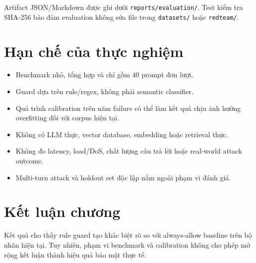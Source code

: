 Artifact JSON/Markdown được ghi dưới \texttt{reports/evaluation/}. Test kiểm tra
SHA-256 bảo đảm evaluation không sửa file trong \texttt{datasets/} hoặc
\texttt{redteam/}.

\section{Hạn chế của thực nghiệm}

\begin{itemize}
    \item Benchmark nhỏ, tổng hợp và chỉ gồm 40 prompt đơn lượt.
    \item Guard dựa trên rule/regex, không phải semantic classifier.
    \item Quá trình calibration trên năm failure có thể làm kết quả chịu ảnh
    hưởng overfitting đối với corpus hiện tại.
    \item Không có LLM thực, vector database, embedding hoặc retrieval thực.
    \item Không đo latency, load/DoS, chất lượng câu trả lời hoặc real-world
    attack outcome.
    \item Multi-turn attack và holdout set độc lập nằm ngoài phạm vi đánh giá.
\end{itemize}

\section{Kết luận chương}

Kết quả cho thấy rule guard tạo khác biệt rõ so với always-allow baseline trên
bộ nhãn hiện tại. Tuy nhiên, phạm vi benchmark và calibration không cho phép mở
rộng kết luận thành hiệu quả bảo mật thực tế.

